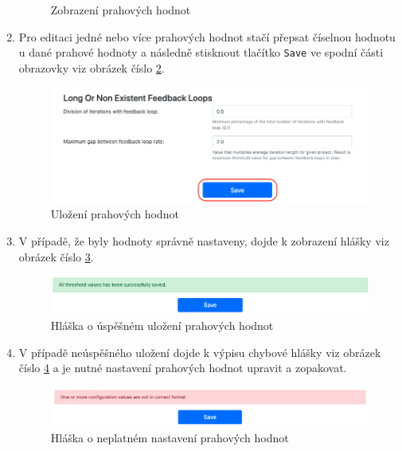 \documentclass[czech,DP]{thesiskiv}
\begin{document}
\begin{enumerate}
\begin{figure}[!htb]
    \caption{Zobrazení prahových hodnot}
    \label{img:user_screen_22}
\end{figure}
\FloatBarrier
    \item Pro editaci jedné nebo více prahových hodnot stačí přepsat číselnou hodnotu u dané prahové hodnoty a následně stisknout tlačítko \texttt{Save} ve spodní části obrazovky viz obrázek číslo \ref{img:user_screen_33}.
    \begin{figure}[!htb]
    \centering
    \includegraphics[width=350pt]{img/user_screen_33.png}
    \caption{Uložení prahových hodnot}
    \label{img:user_screen_33}
\end{figure}
\FloatBarrier
    \item V případě, že byly hodnoty správně nastaveny, dojde k zobrazení hlášky viz obrázek číslo \ref{img:user_screen_44}.
    \begin{figure}[!htb]
    \centering
    \includegraphics[width=400pt]{img/user_screen_44.png}
    \caption{Hláška o úspěšném uložení prahových hodnot}
    \label{img:user_screen_44}
\end{figure}
\FloatBarrier
    \item V případě neúspěšného uložení dojde k výpisu chybové hlášky viz obrázek číslo \ref{img:user_screen_55} a je nutné nastavení prahových hodnot upravit a zopakovat.
    \begin{figure}[!htb]
    \centering
    \includegraphics[width=400pt]{img/user_screen_55.png}
    \caption{Hláška o neplatném nastavení prahových hodnot}
    \label{img:user_screen_55}
\end{figure}
\FloatBarrier
\end{enumerate}
\end{document}
